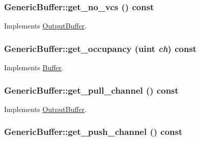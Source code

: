 \hypertarget{classGenericBuffer_528c7b73ffbb3870cab0fc999a01a024}{
\subsubsection[{get\_\-no\_\-vcs}]{ GenericBuffer::get\_\-no\_\-vcs () const}}
\label{classGenericBuffer_528c7b73ffbb3870cab0fc999a01a024}




Implements \hyperlink{classOutputBuffer_21ad5222afd999f390df4a495eb48b0a}{OutputBuffer}.\hypertarget{classGenericBuffer_f2f85cf979616bab9dad5373d25d7813}{
\subsubsection[{get\_\-occupancy}]{ GenericBuffer::get\_\-occupancy ({\bf uint} {\em ch}) const}}
\label{classGenericBuffer_f2f85cf979616bab9dad5373d25d7813}




Implements \hyperlink{classBuffer_af4e2d4031945429ae58350b5897570a}{Buffer}.\hypertarget{classGenericBuffer_3e87475edf8151591ef57f9ca4cd9a25}{
\subsubsection[{get\_\-pull\_\-channel}]{ GenericBuffer::get\_\-pull\_\-channel () const}}
\label{classGenericBuffer_3e87475edf8151591ef57f9ca4cd9a25}




Implements \hyperlink{classOutputBuffer_c4460c1a1ac34667c12cc77c57a393b9}{OutputBuffer}.\hypertarget{classGenericBuffer_3b5ed41f7cee8ba1fa059aaa0b9db55a}{
\subsubsection[{get\_\-push\_\-channel}]{ GenericBuffer::get\_\-push\_\-channel () const}}
\label{classGenericBuffer_3b5ed41f7cee8ba1fa059aaa0b9db55a}




